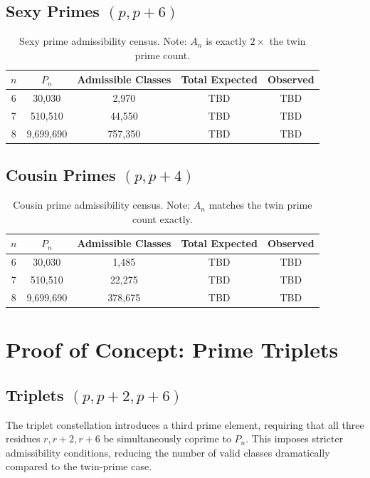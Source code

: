 \documentclass[10pt,a4paper]{article}
\theoremstyle{remark}
\begin{document}
\subsection{Sexy Primes $(p, p+6)$}
\begin{table}[h]
\centering
\begin{tabular}{ccccc}
\toprule
$n$ & $P_n$ & Admissible Classes & Total Expected & Observed \\
\midrule
6 & 30,030 & 2,970 & TBD & TBD \\
7 & 510,510 & 44,550 & TBD & TBD \\
8 & 9,699,690 & 757,350 & TBD & TBD \\
\bottomrule
\end{tabular}
\caption{Sexy prime admissibility census. Note: $A_n$ is exactly $2\times$ the twin prime count.}
\end{table}

\subsection{Cousin Primes $(p, p+4)$}
\begin{table}[h]
\centering
\begin{tabular}{ccccc}
\toprule
$n$ & $P_n$ & Admissible Classes & Total Expected & Observed \\
\midrule
6 & 30,030 & 1,485 & TBD & TBD \\
7 & 510,510 & 22,275 & TBD & TBD \\
8 & 9,699,690 & 378,675 & TBD & TBD \\
\bottomrule
\end{tabular}
\caption{Cousin prime admissibility census. Note: $A_n$ matches the twin prime count exactly.}
\end{table}

\section{Proof of Concept: Prime Triplets}

\subsection{Triplets $(p, p+2, p+6)$}

The triplet constellation introduces a third prime element, requiring that all three
residues $r, r+2, r+6$ be simultaneously coprime to $P_n$. This imposes stricter
admissibility conditions, reducing the number of valid classes dramatically compared
to the twin-prime case.
\end{document}

